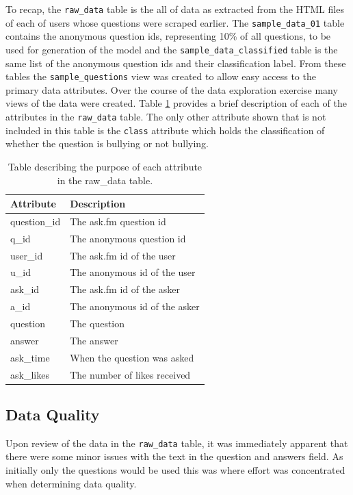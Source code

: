 To recap, the \verb|raw_data| table is the all of data as extracted from the HTML files of each of users whose questions were scraped earlier. The \verb|sample_data_01| table contains the anonymous question ids, representing 10\% of all questions, to be used for generation of the model and the \verb|sample_data_classified| table is the same list of the anonymous question ids and their classification label. From these tables the \verb|sample_questions| view was created to allow easy access to the primary data attributes. Over the course of the data exploration exercise many views of the data were created. Table \ref{tab:chapter4:rawdata} provides a brief description of each of the attributes in the \verb|raw_data| table. The only other attribute shown that is not included in this table is the \verb|class| attribute which holds the classification of whether the question is bullying or not bullying.

\begin{table}[h]
\centering
\caption[Description of raw\_data table]{Table describing the purpose of each attribute in the raw\_data table.}
\label{tab:chapter4:rawdata}
\begin{tabular}{ll}
	\toprule
    \textbf{Attribute}    & \textbf{Description}                   \\
    \midrule
    question\_id & The ask.fm question id        \\
    q\_id        & The anonymous question id     \\
    user\_id     & The ask.fm id of the user     \\
    u\_id        & The anonymous id of the user  \\
    ask\_id      & The ask.fm id of the asker    \\
    a\_id        & The anonymous id of the asker \\
    question     & The question                  \\
    answer       & The answer                    \\
    ask\_time    & When the question was asked   \\
    ask\_likes   & The number of likes received  \\
    \bottomrule
    \end{tabular}
\end{table}

\subsection{Data Quality}
Upon review of the data in the \verb|raw_data| table, it was immediately apparent that there were some minor issues with the text in the question and answers field. As initially only the questions would be used this was where effort was concentrated when determining data quality.

